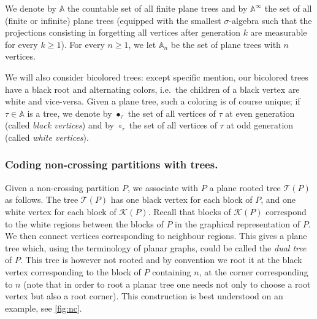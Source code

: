 \documentclass[10pt]{amsart}
\theoremstyle{definition}\newtheorem{defi}[theo]{Definition}\newtheorem{rema}[theo]{Remark}\newtheorem{exam}[theo]{Example}\newtheorem{exem}[theo]{Example}\newtheorem{nota}[theo]{Notation}
\def\TTT{\mathcal T}
\begin{document}
We denote by $\mathbb{A}$ the countable set of all finite plane trees and by $\mathbb{A}^{\infty}$   the  set of all (finite or infinite) plane trees
(equipped with the smallest $\sigma$-algebra such that
the projections consisting in forgetting all vertices after generation $k$
are measurable for every $k \geq 1$).
For every  $n \geq 1$, we let $\mathbb{A}_n$
be the set of plane trees with $n$ vertices.

We will also consider bicolored trees:
except specific mention, our bicolored trees have a black root and alternating colors,
i.e.\ the children of a black vertex are white and vice-versa.
Given a plane tree, such a coloring is of course unique;
if $\tau \in \mathbb{A}$ is a tree, we denote by $\bullet_{\tau}$ the set of all vertices of $\tau$ at even generation (called \emph{black vertices}) and by $\circ_{\tau}$ the set of all vertices of $\tau$ at odd generation (called \emph{white vertices}).



\subsubsection{Coding non-crossing partitions with trees.}
\label{sec:coding}
Given a non-crossing partition $P$, we associate with $P$ a plane rooted tree $\TTT(P)$ as follows.
The tree $\TTT(P)$ has one black vertex for each block of $P$, and one white vertex for each block of $\mathcal K(P)$.
Recall that blocks of $\mathcal K(P)$ correspond to the white regions between the blocks of $P$
in the graphical representation of $P$.
We then connect vertices corresponding to neighbour regions.
This gives a plane tree which, using the terminology of planar graphs,
could be called the {\em dual tree} of $P$.
This tree is however not rooted and by convention we  root it at the black vertex
corresponding to the block of $P$ containing $n$, at the corner corresponding to $n$
(note that in order to root a planar tree  one needs not only to choose a root vertex but also a root corner).
This construction is best understood on an example, see \cref{fig:nc}.
\end{document}
